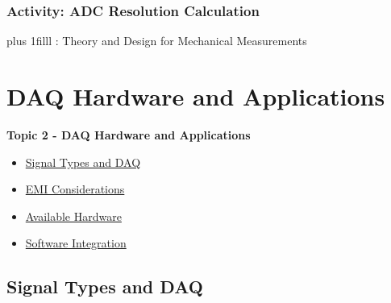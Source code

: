 \documentclass[fleqn]{beamer} %
\newcommand{\sectionIItitle}{DAQ Hardware and Applications}
\newcommand{\sectionIsubsectionIVtitle}{Activity: ADC Resolution Calculation}
\newcommand{\sectionIIsubsectionItitle}{Signal Types and DAQ}
\newcommand{\sectionIIsubsectionIItitle}{EMI Considerations}
\newcommand{\sectionIIsubsectionIIItitle}{Available Hardware}
\newcommand{\sectionIIsubsectionIVtitle}{Software Integration}
\newcommand{\btVFill}{\vskip0pt plus 1filll}
\begin{document}
			\begin{frame}
				\frametitle{\sectionIsubsectionIVtitle}

				\bigskip


				\btVFill
				\tiny{: Theory and Design for Mechanical Measurements}
										
			\end{frame}

	
	\section{\sectionIItitle}\label{sectionII}

		\begin{frame}
			\large \textbf{Topic 2 - \sectionIItitle} \vspace{3mm}\\

			\begin{itemize}
				\item \hyperlink{sectionIIsubsectionI}{\sectionIIsubsectionItitle} \vspc %
				\item \hyperlink{sectionIIsubsectionII}{\sectionIIsubsectionIItitle} \vspc %
				\item \hyperlink{sectionIIsubsectionIII}{\sectionIIsubsectionIIItitle} \vspc %
				\item \hyperlink{sectionIIsubsectionIV}{\sectionIIsubsectionIVtitle} \vspc %
			\end{itemize}

		\end{frame}

		\subsection{\sectionIIsubsectionItitle}\label{sectionIIsubsectionI}
\end{document}
